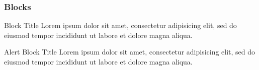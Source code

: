 \label{blocks}
\begin{frame}\frametitle{Blocks}
  \begin{block}{Block Title}
    Lorem ipsum dolor sit amet, consectetur adipisicing elit, sed do eiusmod tempor incididunt ut labore et dolore magna aliqua.
  \end{block}
  \begin{alertblock}{Alert Block Title}
    Lorem ipsum dolor sit amet, consectetur adipisicing elit, sed do eiusmod tempor incididunt ut labore et dolore magna aliqua.
  \end{alertblock}
\end{frame}